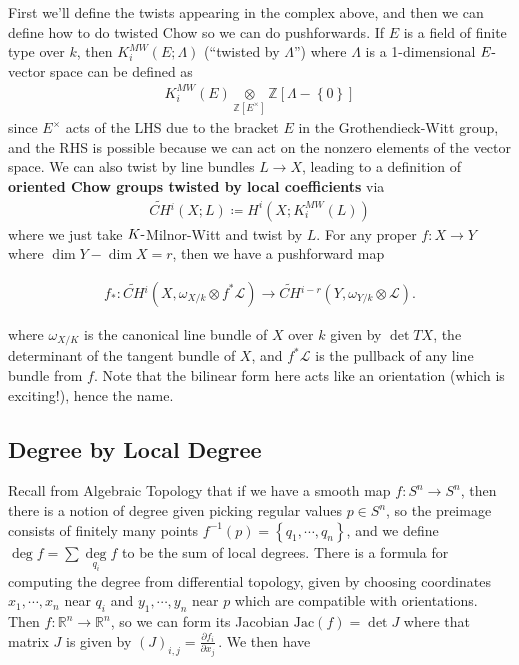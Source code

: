 First we'll define the twists appearing in the complex above, and then
we can define how to do twisted Chow so we can do pushforwards. If \(E\)
is a field of finite type over \(k\), then \(K^{MW}_i(E; \Lambda)\)
(``twisted by \(\Lambda\)'') where \(\Lambda\) is a 1-dimensional
\(E{\hbox{-}}\)vector space can be defined as
\begin{align*}
K^{MW}_i(E) \underset{{\mathbb{Z}}[E^\times]}\otimes{\mathbb{Z}}[\Lambda - \left\{{0}\right\}]
\end{align*}
since \(E^\times\) acts of the LHS due to the bracket \(E\) in the
Grothendieck-Witt group, and the RHS is possible because we can act on
the nonzero elements of the vector space. We can also twist by line
bundles \(L \to X\), leading to a definition of \textbf{oriented Chow
groups twisted by local coefficients} via
\begin{align*}
\widetilde{CH}{}^i(X; L) \coloneqq H^i(X; K^{MW}_i(L))
\end{align*}
where we just take \(K{\hbox{-}}\)Milnor-Witt and twist by \(L\). For
any proper \(f: X\to Y\) where \(\dim Y - \dim X = r\), then we have a
pushforward map

\begin{align*} f_*: \widetilde{CH}{}^i(X, \omega_{X/k}\otimes f^* \mathcal L) \to \widetilde{CH}{}^{i-r}(Y, \omega_{Y/k}\otimes\mathcal L) .\end{align*}

where \(\omega_{X/K}\) is the canonical line bundle of \(X\) over \(k\)
given by \(\det TX\), the determinant of the tangent bundle of \(X\),
and \(f^* \mathcal L\) is the pullback of any line bundle from \(f\).
Note that the bilinear form here acts like an orientation (which is
exciting!), hence the name.

\hypertarget{degree-by-local-degree}{%
\subsection{Degree by Local Degree}\label{degree-by-local-degree}}

Recall from Algebraic Topology that if we have a smooth map
\(f:S^n \to S^n\), then there is a notion of degree given picking
regular values \(p\in S^n\), so the preimage consists of finitely many
points \(f^{-1}(p) = \left\{{q_1, \cdots, q_n}\right\}\), and we define
\(\deg f = \sum \underset{q_i}\deg f\) to be the sum of local degrees.
There is a formula for computing the degree from differential topology,
given by choosing coordinates \(x_1, \cdots, x_n\) near \(q_i\) and
\(y_1, \cdots, y_n\) near \(p\) which are compatible with orientations.
Then \(f:{\mathbb{R}}^n\to{\mathbb{R}}^n\), so we can form its Jacobian
\(\mathrm{Jac}(f) = \det J\) where that matrix \(J\) is given by
\((J)_{i,j} = {\frac{\partial f_i}{\partial x_j}\,}\). We then have

